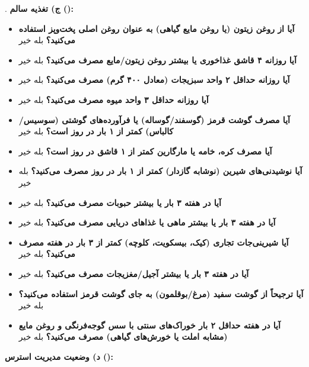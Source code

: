 . \textbf{ج) تغذیه سالم ():}
\begin{itemize}
  \item \textbf{آیا از روغن زیتون (یا روغن مایع گیاهی) به عنوان روغن اصلی پخت‌وپز استفاده می‌کنید؟} \checkbox{} بله \quad \checkbox{} خیر
  \item \textbf{آیا روزانه ۴ قاشق غذاخوری یا بیشتر روغن زیتون/مایع مصرف می‌کنید؟} \checkbox{} بله \quad \checkbox{} خیر
  \item \textbf{آیا روزانه حداقل ۲ واحد سبزیجات (معادل ۴۰۰ گرم) مصرف می‌کنید؟} \checkbox{} بله \quad \checkbox{} خیر
  \item \textbf{آیا روزانه حداقل ۳ واحد میوه مصرف می‌کنید؟} \checkbox{} بله \quad \checkbox{} خیر
  \item \textbf{آیا مصرف گوشت قرمز (گوسفند/گوساله) یا فرآورده‌های گوشتی (سوسیس/کالباس) کمتر از ۱ بار در روز است؟} \checkbox{} بله \quad \checkbox{} خیر
  \item \textbf{آیا مصرف کره، خامه یا مارگارین کمتر از ۱ قاشق در روز است؟} \checkbox{} بله \quad \checkbox{} خیر
  \item \textbf{آیا نوشیدنی‌های شیرین (نوشابه گازدار) کمتر از ۱ بار در روز مصرف می‌کنید؟} \checkbox{} بله \quad \checkbox{} خیر
  \item \textbf{آیا در هفته ۳ بار یا بیشتر حبوبات مصرف می‌کنید؟} \checkbox{} بله \quad \checkbox{} خیر
  \item \textbf{آیا در هفته ۳ بار یا بیشتر ماهی یا غذاهای دریایی مصرف می‌کنید؟} \checkbox{} بله \quad \checkbox{} خیر
  \item \textbf{آیا شیرینی‌جات تجاری (کیک، بیسکویت، کلوچه) کمتر از ۳ بار در هفته مصرف می‌کنید؟} \checkbox{} بله \quad \checkbox{} خیر
  \item \textbf{آیا در هفته ۳ بار یا بیشتر آجیل/مغزیجات مصرف می‌کنید؟} \checkbox{} بله \quad \checkbox{} خیر
  \item \textbf{آیا ترجیحاً از گوشت سفید (مرغ/بوقلمون) به جای گوشت قرمز استفاده می‌کنید؟} \checkbox{} بله \quad \checkbox{} خیر
  \item \textbf{آیا در هفته حداقل ۲ بار خوراک‌های سنتی با سس گوجه‌فرنگی و روغن مایع (مشابه املت یا خورش‌های گیاهی) مصرف می‌کنید؟} \checkbox{} بله \quad \checkbox{} خیر
\end{itemize}

\noindent \textbf{د) وضعیت مدیریت استرس ():}

